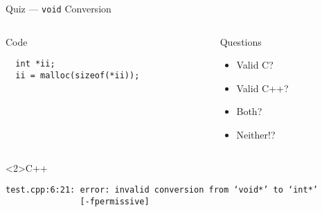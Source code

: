 \documentclass[presentation,aspectratio=169]{beamer}
\begin{document}
\begin{frame}[fragile,label={sec:org23c4234}]{Quiz — \texttt{void} Conversion}
\begin{columns}
\begin{column}{0.48\columnwidth}
\begin{block}{Code}
\begin{verbatim}
  int *ii;
  ii = malloc(sizeof(*ii));
\end{verbatim}
\end{block}
\end{column}

\begin{column}{0.48\columnwidth}
\begin{block}{Questions}
\begin{itemize}
\item Valid C?
\item Valid C++?
\item Both?
\item Neither!?
\end{itemize}
\end{block}
\end{column}
\end{columns}

\begin{block}<2>{C++}
\begin{verbatim}
test.cpp:6:21: error: invalid conversion from ‘void*’ to ‘int*’
               [-fpermissive]
\end{verbatim}
\end{block}
\end{frame}

\end{document}
